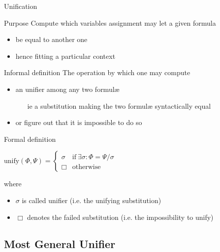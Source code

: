 \documentclass[presentation]{beamer}\mode<presentation>{\usetheme{AMSBolognaFC}}
\begin{document}
\begin{frame}[allowframebreaks]{Unification}
    \begin{block}{Purpose}
        Compute which variables assignment may let a given formula
        \begin{itemize}
            \item be equal to another one
            \item hence fitting a particular context
        \end{itemize}
    \end{block}
    \begin{block}{Informal definition}
        The operation by which one may compute
        \begin{itemize}
            \item an \alert{unifier} among any two formul\ae{}
            \begin{itemize}
                \item[ie] a \alert{substitution} making the two formul\ae{} \alert{syntactically equal}
            \end{itemize}

            \item or figure out that it is impossible to do so
        \end{itemize}
    \end{block}
    \begin{alertblock}{Formal definition}
        \begin{center}
            $\text{unify}(\Phi, \Psi) = \begin{cases}
                \sigma & \text{if} ~ \exists \sigma : \Phi = \Psi / \sigma
                \\
                \Box & \text{otherwise}
            \end{cases}$
        \end{center}
        where
        \begin{itemize}
            \item \alert{$\sigma$} is called \alert{unifier} (i.e. the unifying substitution)
            \item \alert{$\Box$} denotes the \alert{failed} substitution (i.e. the impossibility to unify)
        \end{itemize}
    \end{alertblock}
\end{frame}

\subsection{Most General Unifier}
\end{document}
